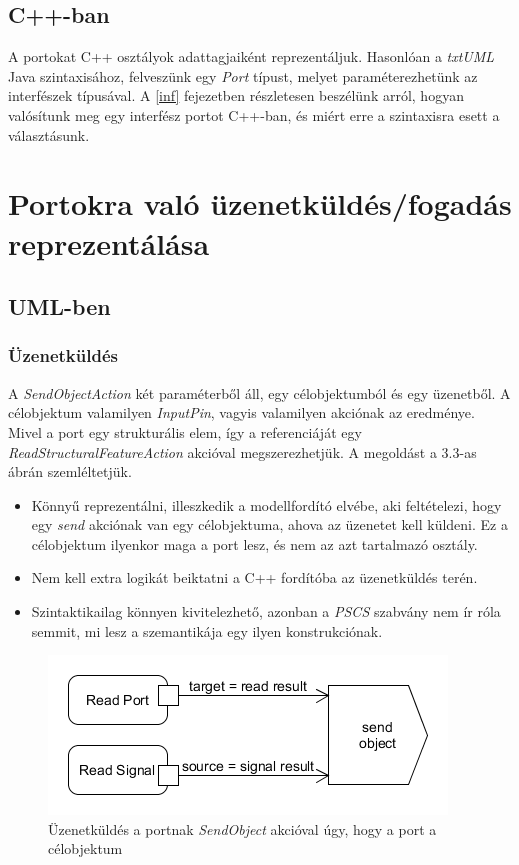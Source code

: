 \documentclass[a4paper,12pt]{report}
\begin{document}
\subsection{C++-ban} \label{cpp_gen_port}
A portokat C++ osztályok adattagjaiként reprezentáljuk. Hasonlóan a \textit{txtUML} Java szintaxisához, felveszünk egy \textit{Port} típust, melyet paraméterezhetünk az interfészek típusával. A \ref{inf} fejezetben részletesen beszélünk arról, hogyan valósítunk meg egy interfész portot C++-ban, és miért erre a szintaxisra esett a választásunk. 

\section{Portokra való üzenetküldés/fogadás reprezentálása} \label{message}
\subsection{UML-ben}

\subsubsection{Üzenetküldés}
A  \textit{SendObjectAction} két paraméterből áll, egy célobjektumból és egy üzenetből.
A célobjektum valamilyen \textit{InputPin}, vagyis valamilyen akciónak az eredménye.
Mivel a port egy strukturális elem, így a referenciáját egy \textit{ReadStructuralFeatureAction} akcióval megszerezhetjük. A megoldást a 3.3-as ábrán szemléltetjük.
\begin{itemize}
\item Könnyű reprezentálni, illeszkedik a modellfordító elvébe, aki feltételezi, hogy
egy \textit{send} akciónak van egy célobjektuma, ahova az üzenetet kell küldeni. Ez a célobjektum ilyenkor maga a port lesz, és nem az azt tartalmazó osztály.
\item Nem kell extra logikát beiktatni a C++ fordítóba az üzenetküldés terén.
\item Szintaktikailag könnyen kivitelezhető, azonban a \textit{PSCS} szabvány nem ír róla semmit, mi lesz a szemantikája egy ilyen konstrukciónak.
\end{itemize}

\begin{figure}[H]
\begin{center}
\includegraphics[scale=0.8]{send_uml.png}
\end{center}
\caption{Üzenetküldés a portnak \textit{SendObject} akcióval úgy, hogy a port a célobjektum}
\end{figure} 
\end{document}
